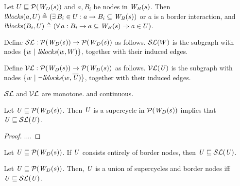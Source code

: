 \begin{definition} \label{defn:blocksLoc}
Let $U \subg \lwfgS{B}{s}{\DS}$ and $a, B_i$ be nodes in $\wfg{B}{s}$. Then 
$\lblocks{a}{U} \df (\ex B_i \in U : a \ar B_i \sub \wfg{B}{s})$ or $a$ is a border interaction, and 
$\lblocks{B_i}{U} \df (\fa a : B_i \ar a \sub\wfg{B}{s} \imp a \in U)$.
\end{definition}


\begin{definition} \label{defn:scFixL}
Define $\lSFs:  \lwfgS{B}{s}{\DS}  \to  \lwfgS{B}{s}{\DS}$ as follows.
$\lSF{W}$ is the subgraph with nodes $\set{w \stt \lblocks{w}{W} }$, together with their induced edges.
\end{definition}

\begin{definition} \label{defn:violFixL}
Define $\lVFs: \lwfgS{B}{s}{\DS}  \to  \lwfgS{B}{s}{\DS}$ as follows.
$\lVF{\US}$ is the subgraph with nodes $\set{w \stt \neg \lblocks{w}{\compl{\US}} }$, together with their induced edges.
\end{definition}

\begin{proposition} \label{prop:monotoneL}
$\lSFs$ and $\lVFs$ are monotone. and continuous.
\end{proposition}

\begin{proposition} \label{prop:supercycleLocGFP}
Let $\UU \subg \lwfgS{B}{s}{\DS}$. Then $\UU$ is a supercycle in $\lwfgS{B}{s}{\DS}$ implies that $\UU \subg \lSF{\UU}$.
\end{proposition}
%
\begin{proof}
....%
\end{proof}

\begin{proposition} \label{prop:borderLocGFP}
Let $\UU \subg \lwfgS{B}{s}{\DS}$. If $\UU$ consists entirely of border nodes, then $\UU \subg \lSF{\UU}$.
\end{proposition}

\begin{proposition} \label{prop:locGFP}
Let $\UU \subg \lwfgS{B}{s}{\DS}$. Then, $\UU$ is a union of supercycles and border nodes iff $\UU \subg \lSF{\UU}$.
\end{proposition}

